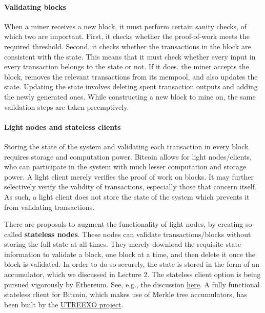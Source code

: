 \documentclass{article}
\begin{document}
\paragraph{Validating blocks} When a miner receives a new block, it must perform certain sanity checks, of which two are important. First, it checks whether the proof-of-work meets the required threshold. Second, it checks whether the transactions in the block are consistent with the state. This means that it must check whether every input in every transaction belongs to the state or not. If it does, the miner accepts the block, removes the relevant transactions from its mempool, and also updates the state. Updating the state involves deleting spent transaction outputs and adding the newly generated ones. While constructing a new block to mine on, the same validation steps are taken preemptively.

\paragraph{Light nodes and stateless clients}
Storing the state of the system and validating each transaction in every block requires storage and computation power. Bitcoin allows for light nodes/clients, who can participate in the system with much lesser computation and storage power. A light client merely verifies the proof of work on blocks. It may further selectively verify the validity of transactions, especially those that concern itself. As such, a light client does not store the state of the system which prevents it from validating transactions.

There are proposals to augment the functionality of light nodes, by creating so-called \textbf{stateless nodes}. These nodes can validate transactions/blocks without storing the full state at all times. They merely download the requisite state information to validate a block, one block at a time, and then delete it once the block is validated. In order to do so securely, the state is stored in the form of an accumulator, which we discussed in Lecture 2. The stateless client option is being pursued vigorously by Ethereum. See, e.g., the discussion \href{https://ethresear.ch/t/the-stateless-client-concept/172}{here}. A fully functional stateless client for Bitcoin, which makes use of Merkle tree accumulators, has been built by the \href{https://www.media.mit.edu/projects/utreexo/overview/}{UTREEXO project}.
\end{document}
